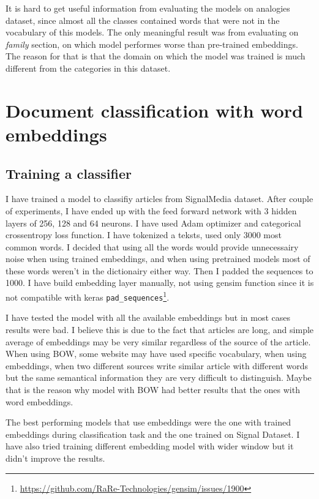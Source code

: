 \documentclass{article}
\begin{document}
It is hard to get useful information from evaluating the models on analogies dataset,
since almost all the classes contained words that were not in the vocabulary of this models.
The only meaningful result was from evaluating on \textit{family} section, on which model performes
worse than pre-trained embeddings. The reason for that is that the domain on which the model was 
trained is much different from the categories in this dataset.

\section{Document classification with word embeddings}

\subsection{Training a classifier}
I have trained a model to classifiy articles from SignalMedia dataset.
After couple of experiments, I have ended up with the feed forward network with
3 hidden layers of 256, 128 and 64 neurons. I have used Adam optimizer and
categorical crossentropy loss function. I have tokenized a teksts, used only 3000 most
common words. I decided that using all the words would provide unnecessairy noise
when using trained embeddings, and when using pretrained models most of these words
weren't in the dictionairy either way. Then I padded the sequences
to 1000. I have build embedding layer manually, not using gensim function since it is not
compatible with keras \lstinline{pad_sequences}\footnote{\href{https://github.com/RaRe-Technologies/gensim/issues/1900}{https://github.com/RaRe-Technologies/gensim/issues/1900}}.

I have tested the model with all the available embeddings but in most cases
results were bad. I believe this is due to the fact that articles are long, and
simple average of embeddings may be very similar regardless of the source of the article.
When using BOW, some website may have used specific vocabulary, when using embeddings,
when two different sources write similar article with different words but the same
semantical information they are very difficult to distinguish. Maybe that is the reason
why model with BOW had better results that the ones with word embeddings.

The best performing models that use embeddings were the one with trained embeddings during
classification task and the one trained on Signal Dataset. I have also tried training different
embedding model with wider window but it didn't improve the results. 
\end{document}
